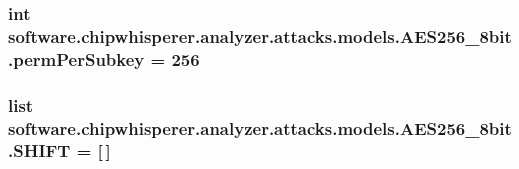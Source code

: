 \subsubsection[{perm\+Per\+Subkey}]{\setlength{\rightskip}{0pt plus 5cm}int software.\+chipwhisperer.\+analyzer.\+attacks.\+models.\+A\+E\+S256\+\_\+8bit.\+perm\+Per\+Subkey = 256}\label{namespacesoftware_1_1chipwhisperer_1_1analyzer_1_1attacks_1_1models_1_1AES256__8bit_a40ffba7b4adedd9dc62993351768816a}
\hypertarget{namespacesoftware_1_1chipwhisperer_1_1analyzer_1_1attacks_1_1models_1_1AES256__8bit_a9d072903bc6589a3d0ceda921ada23ca}{}
\subsubsection[{S\+H\+I\+F\+T}]{\setlength{\rightskip}{0pt plus 5cm}list software.\+chipwhisperer.\+analyzer.\+attacks.\+models.\+A\+E\+S256\+\_\+8bit.\+S\+H\+I\+F\+T = \mbox{[}$\,$\mbox{]}}\label{namespacesoftware_1_1chipwhisperer_1_1analyzer_1_1attacks_1_1models_1_1AES256__8bit_a9d072903bc6589a3d0ceda921ada23ca}
